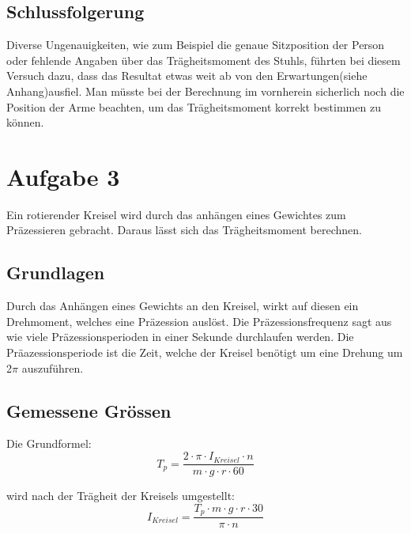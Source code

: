 \documentclass{article}
\begin{document}
\subsection{Schlussfolgerung}

Diverse Ungenauigkeiten, wie zum Beispiel die genaue Sitzposition der Person oder fehlende Angaben über das Trägheitsmoment des Stuhls, führten bei diesem Versuch dazu, dass das Resultat etwas weit ab von den Erwartungen(siehe Anhang)ausfiel. Man müsste bei der Berechnung im vornherein sicherlich noch die Position der Arme beachten, um das Trägheitsmoment korrekt bestimmen zu können.
\newpage
\section{Aufgabe 3}

Ein rotierender Kreisel wird durch das anhängen eines Gewichtes zum Präzessieren gebracht. Daraus lässt sich das Trägheitsmoment berechnen. 
\subsection{Grundlagen}
Durch das Anhängen eines Gewichts an den Kreisel, wirkt auf diesen ein Drehmoment, welches eine 
Präzession auslöst. Die Präzessionsfrequenz sagt aus wie viele Präzessionsperioden in einer Sekunde 
durchlaufen werden. Die Präazessionsperiode ist die Zeit, welche der Kreisel benötigt um eine Drehung um 2$\pi$ auszuführen.
\subsection{Gemessene Grössen}
Die Grundformel: \vspace{0.2cm}\\
\begin{equation}
T_p = \frac{2\cdot\pi\cdot I_{Kreisel}\cdot n}{m\cdot g\cdot r\cdot 60}
\end{equation}


wird nach der Trägheit der Kreisels umgestellt:
\begin{equation}
I_{Kreisel}= \frac{T_p\cdot m\cdot g\cdot r \cdot 30}{ \pi \cdot n}
\end{equation}
\end{document}
